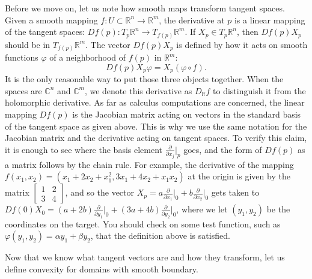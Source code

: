 \documentclass[12pt,openany]{book}
\newcommand{\C}{{\mathbb{C}}}
\newcommand{\R}{{\mathbb{R}}}
\theoremstyle{plain}
\theoremstyle{remark}
\theoremstyle{definition}
\theoremstyle{exercise}
\theoremstyle{example}
\begin{document}
Before we move on, let us note how smooth maps transform tangent spaces.
Given a smooth mapping 
$f \colon U \subset \R^n \to \R^m$,
the derivative at $p$ is a linear mapping of
the tangent spaces: $Df(p) \colon T_p \R^n \to T_{f(p)} \R^m$.
If $X_p \in T_p \R^n$, then 
$Df(p) X_p$ should be in $T_{f(p)} \R^m$.
The vector 
$Df(p) X_p$ is defined by how it acts on
smooth functions $\varphi$ of a neighborhood
of $f(p)$ in $\R^m$:
%
\begin{equation*}
Df(p) X_p \varphi = X_p (\varphi \circ f) .
\end{equation*}
It is the only reasonable way to put those three objects together.
When the spaces are $\C^n$ and $\C^m$, we denote this
derivative as
%
$D_\R f$
to distinguish it from the holomorphic derivative.
As far as calculus computations are concerned,
the linear mapping $Df(p)$ is
the Jacobian matrix acting on vectors in the standard basis of the tangent space
as given above.
This is why we use the same notation for the Jacobian
matrix and the derivative acting on tangent spaces.
To verify this claim, it is enough to see where the basis element
$\frac{\partial}{\partial x_j}\big|_p$ goes, and the form of $Df(p)$
as a matrix
follows by the chain rule.
For example, the derivative of the mapping $f(x_1,x_2) =
(x_1+2x_2+x_1^2,3x_1+4x_2+x_1x_2)$ at the origin is given by the matrix
$\left[ \begin{smallmatrix} 1 & 2 \\ 3 & 4 \end{smallmatrix} \right]$,
and so the vector
$X_p = a\frac{\partial}{\partial x_1}\big|_0
+
b\frac{\partial}{\partial x_2}\big|_0$
gets taken to
$Df(0) X_0 = (a+2b)\frac{\partial}{\partial y_1}\big|_0
+
(3a+4b)\frac{\partial}{\partial y_2}\big|_0$, where we let $(y_1,y_2)$ be the
coordinates on the target.  You should check on some test
function, such as
$\varphi(y_1,y_2) = \alpha y_1 + \beta y_2$, that the definition above is
satisfied.

\medskip

Now that we know what tangent vectors are and how they transform,
let us define convexity
for domains with smooth boundary.
\end{document}
